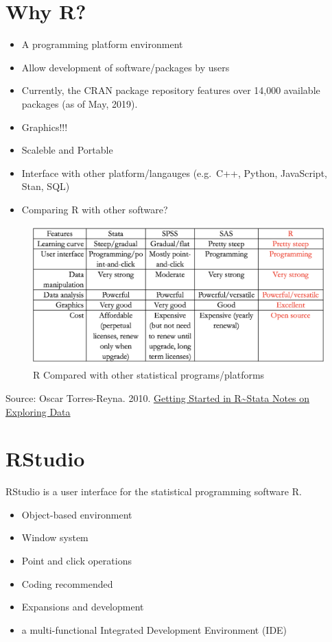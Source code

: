 \documentclass[]{book}
\providecommand{\tightlist}{%
  \setlength{\itemsep}{0pt}\setlength{\parskip}{0pt}}
\begin{document}
\hypertarget{why-r}{%
\section{Why R?}\label{why-r}}

\begin{itemize}
\tightlist
\item
  A programming platform environment
\item
  Allow development of software/packages by users
\item
  Currently, the CRAN package repository features over 14,000 available packages (as of May, 2019).
\item
  Graphics!!!
\item
  Scaleble and Portable
\item
  Interface with other platform/langauges (e.g.~C++, Python, JavaScript, Stan, SQL)
\item
  Comparing R with other software?
\end{itemize}

\begin{figure}
\includegraphics[width=1\linewidth]{Rcompare} \caption{R Compared with other statistical programs/platforms}\label{fig:Rcompare}
\end{figure}

Source: Oscar Torres-Reyna. 2010. \href{https://dss.princeton.edu/training/RStata.pdf}{Getting Started in R\textasciitilde Stata Notes on Exploring Data}

\hypertarget{rstudio}{%
\section{RStudio}\label{rstudio}}

RStudio is a user interface for the statistical programming software R.

\begin{itemize}
\tightlist
\item
  Object-based environment
\item
  Window system
\item
  Point and click operations
\item
  Coding recommended\\
\item
  Expansions and development
\item
  a multi-functional Integrated Development Environment (IDE)
\end{itemize}
\end{document}
